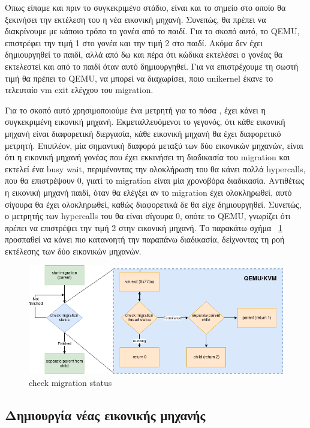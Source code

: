 Όπως είπαμε και πριν το συγκεκριμένο στάδιο, είναι και το σημείο στο οποίο θα
ξεκινήσει την εκτέλεση του η νέα εικονική μηχανή. Συνεπώς, θα πρέπει να
διακρίνουμε με κάποιο τρόπο το γονέα από το παιδί. Για το σκοπό αυτό, το QEMU,
επιστρέφει την τιμή 1 στο γονέα και την τιμή 2 στο παιδί. Ακόμα δεν έχει
δημιουργηθεί το παιδί, αλλά από δω και πέρα ότι κώδικα εκτελέσει ο γονέας θα
εκτελεστεί και από το παιδί όταν αυτό δημιουργηθεί. Για να επιστρέχουμε τη σωστή
τιμή θα πρέπει το QEMU, να μπορεί να διαχωρίσει, ποιο unikernel έκανε το
τελευταίο vm exit ελέγχου του migration. 

Για το σκοπό αυτό χρησιμοποιούμε ένα μετρητή για το πόσα , έχει κάνει
η συγκεκριμένη εικονική μηχανή. Εκμεταλλευόμενοι το γεγονός, ότι κάθε εικονική
μηχανή είναι διαφορετική διεργασία, κάθε εικονική μηχανή θα έχει διαφορετικό
μετρητή. Επιπλέον, μία σημαντική διαφορά μεταξύ των δύο εικονικών μηχανών, είναι
ότι η εικονική μηχανή γονέας που έχει εκκινήσει τη διαδικασία του migration και
εκτελεί ένα busy wait, περιμένοντας την ολοκλήρωση του θα κάνει πολλά
hypercalls, που θα επιστρέψουν 0, γιατί το migration είναι μία χρονοβόρα
διαδικασία. Αντιθέτως η εικονική μηχανή παιδί, όταν θα ελέγξει αν το migration
έχει ολοκληρωθεί, αυτό σίγουρα θα έχει ολοκληρωθεί, καθώς διαφορετικά δε θα είχε
δημιουργηθεί. Συνεπώς, ο μετρητής των hypercalls του θα είναι σίγουρα 0, οπότε
το QEMU, γνωρίζει ότι πρέπει να επιστρέψει την τιμή 2 στην εικονική μηχανή. Το
παρακάτω σχήμα ~\ref{fig4_9} προσπαθεί να κάνει πιο κατανοητή την παραπάνω
διαδικασία, δείχνοντας τη ροή εκτέλεσης των δύο εικονικών μηχανών.  

\begin{figure}[htp]
\centerline{\includegraphics[scale=0.6]{figures/check_migration_status_colored.png}}
\caption{check migration status\label{fig4_9}}
\end{figure}

\subsection{Δημιουργία νέας εικονικής μηχανής}

